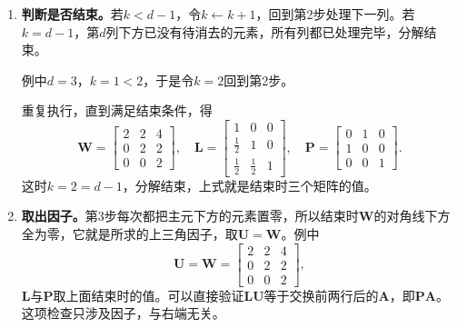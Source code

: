 \begin{enumerate}
 前$k-1$列在第$k$行和第$i$行上都已经是零，减去后仍为零，所以这一步只改变右下角的$(d-k)$阶尾块；$\bm P$不变。计算时使用的都是$\bm W$的当前值，而不是最初的$a_{i,j}$。

 例中$k=1$，乘子为$l_{2,1}=\tfrac12$、$l_{3,1}=\tfrac12$，两行的尾部更新为
 \[
  (3,4)-\tfrac12(2,4)=(2,2),\qquad(2,5)-\tfrac12(2,4)=(1,3),
 \]
 于是
 \[
  \bm W=\begin{bmatrix}2&2&4\\0&2&2\\0&1&3\end{bmatrix},\quad
  \bm L=\begin{bmatrix}1&0&0\\\tfrac12&1&0\\\tfrac12&0&1\end{bmatrix},\quad
  \bm P=\begin{bmatrix}0&1&0\\1&0&0\\0&0&1\end{bmatrix}.
 \]

 \item \textbf{判断是否结束。}若$k<d-1$，令$k\leftarrow k+1$，回到第2步处理下一列。若$k=d-1$，第$d$列下方已没有待消去的元素，所有列都已处理完毕，分解结束。

 例中$d=3$，$k=1<2$，于是令$k=2$回到第2步。
 
 重复执行，直到满足结束条件，得
 \[
  \bm W=\begin{bmatrix}2&2&4\\0&2&2\\0&0&2\end{bmatrix},\quad
  \bm L=\begin{bmatrix}1&0&0\\\tfrac12&1&0\\\tfrac12&\tfrac12&1\end{bmatrix},\quad
  \bm P=\begin{bmatrix}0&1&0\\1&0&0\\0&0&1\end{bmatrix}.
 \]
 这时$k=2=d-1$，分解结束，上式就是结束时三个矩阵的值。

 \item \textbf{取出因子。}第3步每次都把主元下方的元素置零，所以结束时$\bm W$的对角线下方全为零，它就是所求的上三角因子，取$\bm U=\bm W$。例中
 \[
  \bm U=\bm W=\begin{bmatrix}2&2&4\\0&2&2\\0&0&2\end{bmatrix},
 \]
 $\bm L$与$\bm P$取上面结束时的值。可以直接验证$\bm L\bm U$等于交换前两行后的$\bm A$，即$\bm P\bm A$。这项检查只涉及因子，与右端无关。
\end{enumerate}

